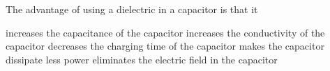 
\begin{questions}\setcounter{question}{29}\question
The advantage of using a dielectric in a capacitor is that it

\begin{choices}
    \choice increases the capacitance of the capacitor
    \choice increases the conductivity of the capacitor
    \choice decreases the charging time of the capacitor
    \choice makes the capacitor dissipate less power
    \choice eliminates the electric field in the capacitor
\end{choices}
\end{questions}
